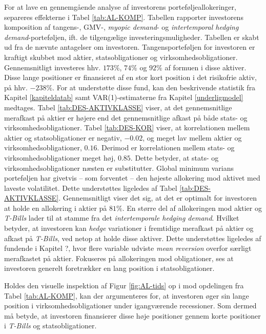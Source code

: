 \documentclass[
  a4paper,
  oneside]{memoir}
\begin{document}
For at lave en gennemgående analyse af investorens porteføljeallokeringer, separeres effekterne i Tabel \ref{tab:AL-KOMP}. Tabellen rapporter investorens komposition af tangens-, GMV-, \emph{myopic demand}- og \emph{intertemporal hedging demand}-porteføljen, ift. de tilgengælige investeringsmuligheder. Tabellen er skabt ud fra de nævnte antagelser om investoren. Tangensporteføljen for investoren er kraftigt skubbet mod aktier, statsobligationer og virksomhedsobligationer. Gennemsnitligt investeres hhv. \(173 \%\), \(74\%\) og \(92\%\) af formuen i disse aktiver. Disse lange positioner er finansieret af en stor kort position i det risikofrie aktiv, på hhv. \(-238\%\). For at understøtte disse fund, kan den beskrivende statistik fra Kapitel \ref{kapiteldatab} samt VAR(1)-estimaterne fra Kapitel \ref{underligmodel} medtages. Tabel \ref{tab:DES-AKTIVKLASSE} viser, at det gennemsnitlige merafkast på aktier er højere end det gennemsnitlige afkast på både stats- og virksomhedsobligationer. Tabel \ref{tab:DES-KOR} viser, at korrelationen mellem aktier og statsobligationer er negativ, \(-0.02\), og meget lav mellem aktier og virksomhedsobligationer, \(0.16\). Derimod er korrelationen mellem stats- og virksomhedsobligationer meget høj, \(0.85\). Dette betyder, at stats- og virksomhedsobligationer næsten er substitutter. Global minimum varians porteføljen har givetvis -- som forventet -- den højeste allokering mod aktivet med laveste volatilitet. Dette understøttes ligeledes af Tabel \ref{tab:DES-AKTIVKLASSE}. Gennemsnitligt viser det sig, at det er optimalt for investoren at holde en allokering i aktier på \(81\%\). En større del af allokeringen mod aktier og \emph{T-Bills} lader til at stamme fra det \emph{intertemporale hedging demand}. Hvilket betyder, at investoren kan \emph{hedge} variationer i fremtidige merafkast på aktier og afkast på \emph{T-Bills}, ved netop at holde disse aktiver. Dette understøttes ligeledes af fundende i Kapitel ?, hvor flere variable udviste \emph{mean reversion} overfor særligt merafkastet på aktier. Fokuseres på allokeringen mod obligationer, ses at investoren generelt foretrækker en lang position i statsobligationer.

Holdes den visuelle inspektion af Figur \ref{fig:AL-tids} op i mod opdelingen fra Tabel \ref{tab:AL-KOMP}, kan der argumenteres for, at investoren øger sin lange position i virksomhedsobligationer under igangværende recessioner. Som dermed må betyde, at investoren finansierer disse høje positioner gennem korte positioner i \emph{T-Bills} og statsobligationer.
\end{document}
